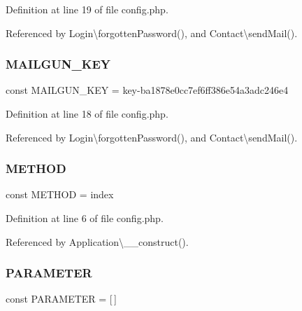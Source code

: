 Definition at line 19 of file config.\+php.



Referenced by Login\textbackslash{}forgotten\+Password(), and Contact\textbackslash{}send\+Mail().

\hypertarget{config_8php_ad320bd8d96c22e094fb9b774f269aaef}{}\label{config_8php_ad320bd8d96c22e094fb9b774f269aaef} 
\subsubsection{\texorpdfstring{M\+A\+I\+L\+G\+U\+N\+\_\+\+K\+EY}{MAILGUN\_KEY}}
{\footnotesize\ttfamily const M\+A\+I\+L\+G\+U\+N\+\_\+\+K\+EY = \textquotesingle{}key-\/ba1878e0cc7ef6ff386e54a3adc246e4\textquotesingle{}}



Definition at line 18 of file config.\+php.



Referenced by Login\textbackslash{}forgotten\+Password(), and Contact\textbackslash{}send\+Mail().

\hypertarget{config_8php_a9d70943cac2f50debb62d2008a6e768d}{}\label{config_8php_a9d70943cac2f50debb62d2008a6e768d} 
\subsubsection{\texorpdfstring{M\+E\+T\+H\+OD}{METHOD}}
{\footnotesize\ttfamily const M\+E\+T\+H\+OD = \textquotesingle{}index\textquotesingle{}}



Definition at line 6 of file config.\+php.



Referenced by Application\textbackslash{}\+\_\+\+\_\+construct().

\hypertarget{config_8php_a75466fbd8ac40be3d3c185c9974118e7}{}\label{config_8php_a75466fbd8ac40be3d3c185c9974118e7} 
\subsubsection{\texorpdfstring{P\+A\+R\+A\+M\+E\+T\+ER}{PARAMETER}}
{\footnotesize\ttfamily const P\+A\+R\+A\+M\+E\+T\+ER = \mbox{[}$\,$\mbox{]}}




